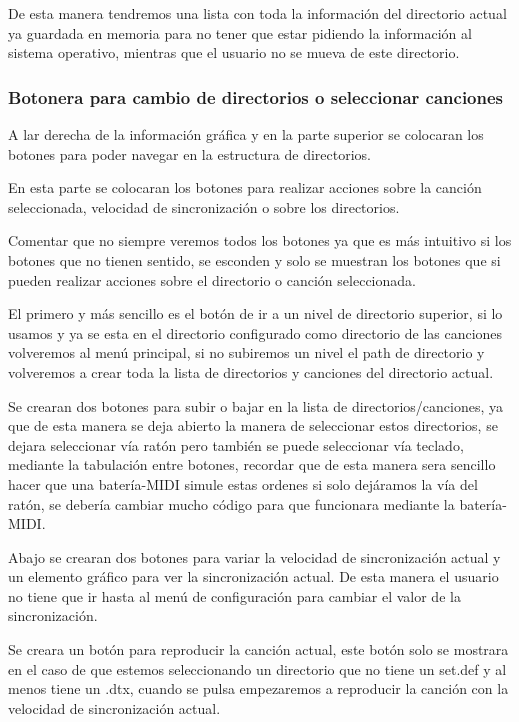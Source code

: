 \documentclass[a4paper,11pt,oneside]{book}
\begin{document}
 
De esta manera tendremos una lista con toda la información del directorio actual ya guardada en memoria para no tener que estar pidiendo la información al sistema operativo, mientras que el usuario no se mueva de este directorio.

\subsubsection{Botonera para cambio de directorios o seleccionar canciones}
A lar derecha de la información gráfica y en la parte superior se colocaran los botones para poder navegar en la estructura de directorios.

En esta parte se colocaran los botones para realizar acciones sobre la canción seleccionada, velocidad de sincronización o sobre los directorios.

Comentar que no siempre veremos todos los botones ya que es más intuitivo si los botones que no tienen sentido, se esconden y solo se muestran los botones que si pueden realizar acciones sobre el directorio o canción seleccionada.

El primero y más sencillo es el botón de ir a un nivel de directorio superior, si lo usamos y ya se esta en el directorio configurado como directorio de las canciones volveremos al menú principal, si no subiremos un nivel el path de directorio y volveremos a crear toda la lista de directorios y canciones del directorio actual.

Se crearan dos botones para subir o bajar en la lista de directorios/canciones, ya que de esta manera se deja abierto la manera de seleccionar estos directorios, se dejara seleccionar vía ratón pero también se puede seleccionar vía teclado, mediante la tabulación entre botones, recordar que de esta manera sera sencillo hacer que una batería-MIDI simule estas ordenes si solo dejáramos la vía del ratón, se debería cambiar mucho código para que funcionara mediante la batería-MIDI.

Abajo se crearan dos botones para variar la velocidad de sincronización actual y un elemento gráfico para ver la sincronización actual. De esta manera el usuario no tiene que ir hasta al menú de configuración para cambiar el valor de la sincronización.

Se creara un botón para reproducir la canción actual, este botón solo se mostrara en el caso de que estemos seleccionando un directorio que no tiene un set.def y al menos tiene un .dtx, cuando se pulsa empezaremos a reproducir la canción con la velocidad de sincronización actual.
\end{document}
